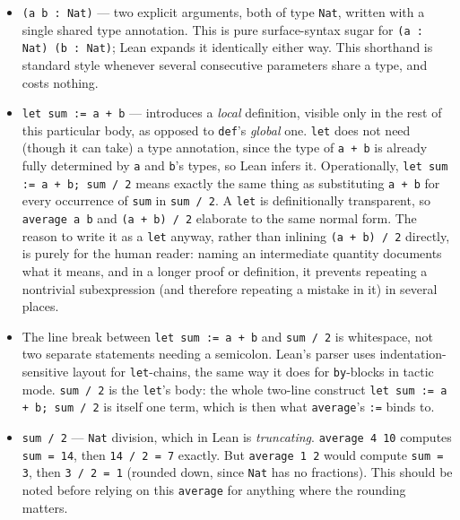\begin{itemize}
\tightlist
\item
  \texttt{(a b : Nat)} --- two explicit arguments, both of type \texttt{Nat}, written with a single shared type annotation. This is pure surface-syntax sugar for \texttt{(a : Nat) (b : Nat)}; Lean expands it identically either way. This shorthand is standard style whenever several consecutive parameters share a type, and costs nothing.
\item
  \texttt{let sum := a + b} --- introduces a \emph{local} definition, visible only in the rest of this particular body, as opposed to \texttt{def}'s \emph{global} one. \texttt{let} does not need (though it can take) a type annotation, since the type of \texttt{a + b} is already fully determined by \texttt{a} and \texttt{b}'s types, so Lean infers it. Operationally, \texttt{let sum := a + b; sum /\allowbreak{} 2} means exactly the same thing as substituting \texttt{a + b} for every occurrence of \texttt{sum} in \texttt{sum /\allowbreak{} 2}. A \texttt{let} is definitionally transparent, so \texttt{average a b} and \texttt{(a + b) /\allowbreak{} 2} elaborate to the same normal form. The reason to write it as a \texttt{let} anyway, rather than inlining \texttt{(a + b) /\allowbreak{} 2} directly, is purely for the human reader: naming an intermediate quantity documents what it means, and in a longer proof or definition, it prevents repeating a nontrivial subexpression (and therefore repeating a mistake in it) in several places.
\item
  The line break between \texttt{let sum := a + b} and \texttt{sum /\allowbreak{} 2} is whitespace, not two separate statements needing a semicolon. Lean's parser uses indentation-sensitive layout for \texttt{let}-chains, the same way it does for \texttt{by}-blocks in tactic mode. \texttt{sum /\allowbreak{} 2} is the \texttt{let}'s body: the whole two-line construct \texttt{let sum := a + b; sum /\allowbreak{} 2} is itself one term, which is then what \texttt{average}'s \texttt{:=} binds to.
\item
  \texttt{sum /\allowbreak{} 2} --- \texttt{Nat} division, which in Lean is \emph{truncating}. \texttt{average 4 10} computes \texttt{sum = 14}, then \texttt{14 /\allowbreak{} 2 = 7} exactly. But \texttt{average 1 2} would compute \texttt{sum = 3}, then \texttt{3 /\allowbreak{} 2 = 1} (rounded down, since \texttt{Nat} has no fractions). This should be noted before relying on this \texttt{average} for anything where the rounding matters.
\end{itemize}

